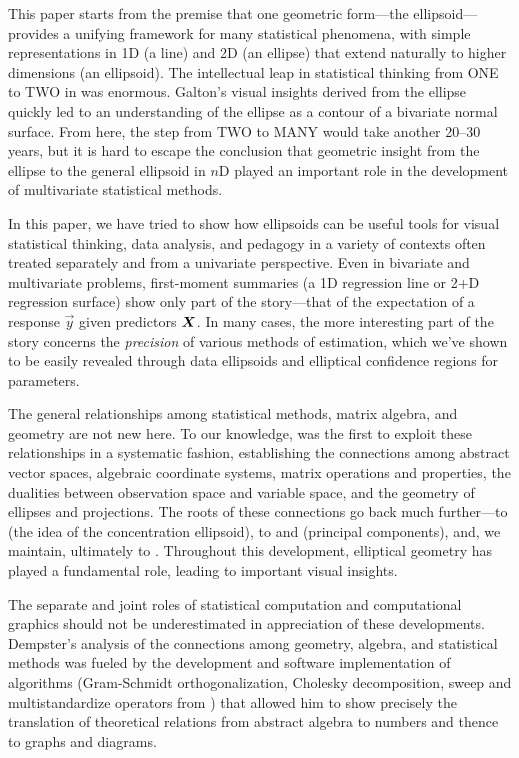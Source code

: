 This paper starts from the premise that one geometric form---the ellipsoid---provides a unifying framework for many statistical phenomena, with simple representations in
1D (a line) and 2D (an ellipse) that extend naturally to higher dimensions (an ellipsoid).  The intellectual leap
in statistical thinking from ONE to TWO in \citet{Galton:1886} was enormous.
Galton's visual insights derived from the ellipse quickly led to an understanding of the
ellipse as a contour of a bivariate normal surface.  From here, the step from TWO to MANY
would take another 20--30 years, but it is hard to escape the conclusion that
geometric insight from the ellipse to the general ellipsoid in $n$D
played an important role in the development of multivariate statistical methods.

In this paper, we have tried to show how ellipsoids can be useful tools for
visual statistical thinking, data analysis, and pedagogy in a variety of contexts often
treated separately and from a univariate perspective.  Even in bivariate
and multivariate problems, first-moment summaries (a 1D regression line
or 2+D regression surface) show only part of the story---that of the
expectation of a response $\vec{y}$ given predictors $\bm{X}$.
In many cases, the more interesting part of the story concerns the
\emph{precision} of various methods of estimation, which we've shown
to be easily revealed through data ellipsoids and
elliptical confidence regions for parameters.

The general relationships among statistical methods, matrix algebra, and geometry are
not new here.  To our knowledge, \citet{Dempster:69} was the first to exploit these relationships
in a systematic fashion, establishing the connections among abstract vector spaces,
algebraic coordinate systems, matrix operations and properties, the dualities
between observation space and variable space,
 and the geometry
of ellipses and projections.%
The roots of these connections go back much further---to
\citet{Cramer:1946} (the idea of the concentration ellipsoid), to
\citet{Pearson:1901} and \citet{Hotelling:1933} (principal components),
and, we maintain, ultimately to \citet{Galton:1886}.
Throughout this development, elliptical geometry has played
a fundamental role, leading to important visual insights.

The separate and joint roles of statistical computation and computational graphics should not be underestimated
in appreciation of these developments.  Dempster's analysis of the connections among geometry, algebra, and
statistical methods was fueled by the development and software implementation of algorithms
(Gram-Schmidt orthogonalization, Cholesky decomposition, sweep and multistandardize operators from
\citealp{Beaton:64})
that allowed him to show precisely the translation of theoretical relations
from abstract algebra to numbers and thence to graphs and diagrams.


